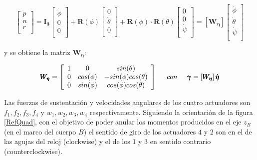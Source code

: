 \documentclass[twoside,11pt]{book}
\begin{document}
\begin{equation}
\left[ \begin{array}{c}
p \\
n \\
r\\\end{array} \right] = \pmb{I_{3}}\left[\begin{array}{c}
\dot{\phi} \\
0 \\
0 \\ \end{array} \right] + \pmb{R}(\phi) \left[ \begin{array}{c}
0 \\
\dot{\theta} \\
0 \\ \end{array} \right] + \pmb{R}(\phi)\cdot \pmb{R}(\theta) \left[ \begin{array}{c}
0 \\
0 \\
\dot{\psi} \\ \end{array} \right]= \left[ \pmb{W_{\eta}} \right] \left[ \begin{array}{c}
\dot{\phi} \\
\dot{\theta} \\
\dot{\psi} \\ \end{array} \right] 
\end{equation}

y se obtiene la matriz $\pmb{W_\eta}$:

\begin{equation}
\pmb{W_\eta}=\left[\begin{array}{ccc}
1 & 0 & sin(\theta) \\
0 & cos(\phi) & -sin(\phi)cos(\theta) \\
0 & sin(\phi) & cos(\phi)cos(\theta) \\
\end{array} \right] \hspace{0.5cm} con \hspace{0.5cm} 
\pmb{\gamma}=\left[ \pmb{W_\eta} \right] \pmb{\dot{\eta}} 
\end{equation}

Las fuerzas de sustentación y velocidades angulares de los cuatro actuadores son $f_1,f_2,f_3,f_4$ y $w_1,w_2,w_3,w_4$ respectivamente. Siguiendo la orientación de la figura \ref{RefQuad}, con el objetivo de poder anular los momentos producidos en el eje $z_B$ (en el marco del cuerpo $B$) el sentido de giro de los actuadores  $4$ y $2$ son en el de las agujas del reloj (clockwise) y el de los $1$ y $3$ en sentido contrario (counterclockwise).
\end{document}
